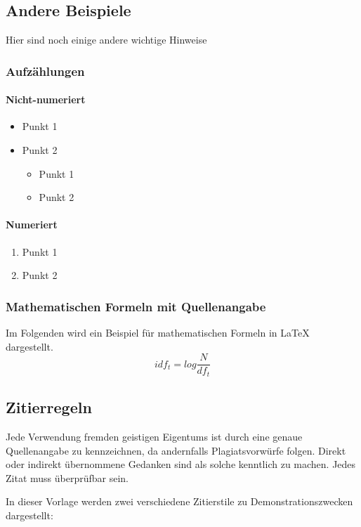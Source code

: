 \subsection{Andere Beispiele}
Hier sind noch einige andere wichtige Hinweise

\subsubsection{Aufzählungen}
\paragraph{Nicht-numeriert}
\begin{itemize}
\item Punkt 1
\item Punkt 2
	\begin{itemize}
	\item Punkt 1
	\item Punkt 2
	\end{itemize}
\end{itemize}
\paragraph{Numeriert}
\begin{enumerate}
\item Punkt 1
\item Punkt 2
\end{enumerate}

\subsubsection{Mathematischen Formeln mit Quellenangabe}
Im Folgenden wird ein Beispiel für mathematischen Formeln in LaTeX dargestellt.
\begin{equation}
\label{eq:idf}
		idf_{t} = log \dfrac{N}{df_{t}} 
\end{equation}
\citep[S. 118]{manning2008}

\subsection{Zitierregeln}

Jede Verwendung fremden geistigen Eigentums ist durch eine genaue Quellenangabe zu kennzeichnen, da andernfalls Plagiatsvorwürfe folgen. Direkt oder indirekt übernommene Gedanken sind als solche kenntlich zu machen. Jedes Zitat muss überprüfbar sein.

In dieser Vorlage werden zwei verschiedene Zitierstile zu Demonstrationszwecken dargestellt:

